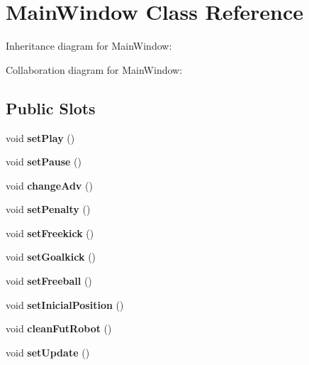 \hypertarget{classMainWindow}{}\section{Main\+Window Class Reference}
\label{classMainWindow}


Inheritance diagram for Main\+Window\+:


Collaboration diagram for Main\+Window\+:
\subsection*{Public Slots}
\begin{DoxyCompactItemize}
\item 
void {\bfseries set\+Play} ()\hypertarget{classMainWindow_ade99af5cad7a3d65bdc8669dc4527fc0}{}\label{classMainWindow_ade99af5cad7a3d65bdc8669dc4527fc0}

\item 
void {\bfseries set\+Pause} ()\hypertarget{classMainWindow_a2fb8f56ab92f47da1bffc920218957dd}{}\label{classMainWindow_a2fb8f56ab92f47da1bffc920218957dd}

\item 
void {\bfseries change\+Adv} ()\hypertarget{classMainWindow_aa3a715a66d534dfab01dd57cf30bbc52}{}\label{classMainWindow_aa3a715a66d534dfab01dd57cf30bbc52}

\item 
void {\bfseries set\+Penalty} ()\hypertarget{classMainWindow_ad112bdbeb016bdce51ecbe894e77d54e}{}\label{classMainWindow_ad112bdbeb016bdce51ecbe894e77d54e}

\item 
void {\bfseries set\+Freekick} ()\hypertarget{classMainWindow_a2e17c2b33fc4f8d940b907bd13f7b4c1}{}\label{classMainWindow_a2e17c2b33fc4f8d940b907bd13f7b4c1}

\item 
void {\bfseries set\+Goalkick} ()\hypertarget{classMainWindow_ac6b3b242e478bd9285a9c7d007e1b810}{}\label{classMainWindow_ac6b3b242e478bd9285a9c7d007e1b810}

\item 
void {\bfseries set\+Freeball} ()\hypertarget{classMainWindow_a4c8865fc2c58e7f54f6742e9e85d80ab}{}\label{classMainWindow_a4c8865fc2c58e7f54f6742e9e85d80ab}

\item 
void {\bfseries set\+Inicial\+Position} ()\hypertarget{classMainWindow_a99d284aceb4b64ce07f5de8fc3cc34c2}{}\label{classMainWindow_a99d284aceb4b64ce07f5de8fc3cc34c2}

\item 
void {\bfseries clean\+Fut\+Robot} ()\hypertarget{classMainWindow_a496719d1f29fa9bcf1ae7a25bdc1f473}{}\label{classMainWindow_a496719d1f29fa9bcf1ae7a25bdc1f473}

\item 
void {\bfseries set\+Update} ()\hypertarget{classMainWindow_a650e5c15a9f5878b8501d32b093a06ff}{}\label{classMainWindow_a650e5c15a9f5878b8501d32b093a06ff}

\end{DoxyCompactItemize}
